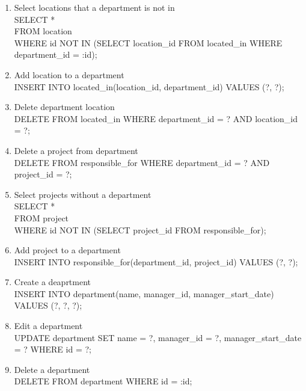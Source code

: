 \documentclass[11pt,letterpaper]{article}
\begin{document}
\begin{enumerate}
		\item Select locations that a department is not in\\SELECT * \\FROM location \\WHERE id NOT IN (SELECT location\_id FROM located\_in WHERE department\_id = :id);
		\item Add location to a department \\INSERT INTO located\_in(location\_id, department\_id) VALUES (?, ?);
		\item Delete department location \\DELETE FROM located\_in WHERE department\_id = ? AND location\_id = ?; 
		\item Delete a project from department \\DELETE FROM responsible\_for WHERE department\_id = ? AND project\_id = ?;
		\item Select projects without a department \\SELECT * \\FROM project \\WHERE id NOT IN (SELECT project\_id FROM responsible\_for);
		\item Add project to a department\\INSERT INTO responsible\_for(department\_id, project\_id) VALUES (?, ?);
		\item Create a deaprtment\\INSERT INTO department(name, manager\_id, manager\_start\_date) VALUES (?, ?, ?);
		\item Edit a department \\UPDATE department SET name = ?, manager\_id = ?, manager\_start\_date = ? WHERE id = ?;
		\item Delete a department \\DELETE FROM department WHERE id = :id;
	\end{enumerate}
\end{document}
